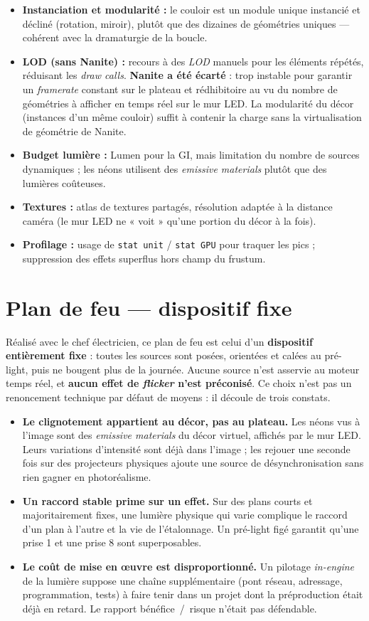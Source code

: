 \documentclass[11pt,a4paper]{report}
\begin{document}
\begin{itemize}
\item \textbf{Instanciation et modularité :} le couloir est un module unique instancié et décliné (rotation, miroir), plutôt que des dizaines de géométries uniques --- cohérent avec la dramaturgie de la boucle.
\item \textbf{LOD (sans Nanite) :} recours à des \emph{LOD} manuels pour les éléments répétés, réduisant les \emph{draw calls}. \textbf{Nanite a été écarté} : trop instable pour garantir un \emph{framerate} constant sur le plateau et rédhibitoire au vu du nombre de géométries à afficher en temps réel sur le mur LED. La modularité du décor (instances d'un même couloir) suffit à contenir la charge sans la virtualisation de géométrie de Nanite.
\item \textbf{Budget lumière :} Lumen pour la GI, mais limitation du nombre de sources dynamiques ; les néons utilisent des \emph{emissive materials} plutôt que des lumières coûteuses.
\item \textbf{Textures :} atlas de textures partagés, résolution adaptée à la distance caméra (le mur LED ne « voit » qu'une portion du décor à la fois).
\item \textbf{Profilage :} usage de \texttt{stat unit} / \texttt{stat GPU} pour traquer les pics ; suppression des effets superflus hors champ du frustum.
\end{itemize}

\section{Plan de feu --- dispositif fixe}
\label{sec:lumiere_fixe}
Réalisé avec le chef électricien, ce plan de feu est celui d'un \textbf{dispositif entièrement fixe} :
toutes les sources sont posées, orientées et calées au pré-light, puis ne bougent plus de la
journée. Aucune source n'est asservie au moteur temps réel, et \textbf{aucun effet de
\emph{flicker} n'est préconisé}. Ce choix n'est pas un renoncement technique par défaut de
moyens : il découle de trois constats.

\begin{itemize}
\item \textbf{Le clignotement appartient au décor, pas au plateau.} Les néons vus à l'image sont
des \emph{emissive materials} du décor virtuel, affichés par le mur LED. Leurs variations
d'intensité sont déjà dans l'image ; les rejouer une seconde fois sur des projecteurs physiques
ajoute une source de désynchronisation sans rien gagner en photoréalisme.
\item \textbf{Un raccord stable prime sur un effet.} Sur des plans courts et majoritairement fixes,
une lumière physique qui varie complique le raccord d'un plan à l'autre et la vie de l'étalonnage.
Un pré-light figé garantit qu'une prise 1 et une prise 8 sont superposables.
\item \textbf{Le coût de mise en \oe uvre est disproportionné.} Un pilotage \emph{in-engine} de la
lumière suppose une chaîne supplémentaire (pont réseau, adressage, programmation, tests) à
faire tenir dans un projet dont la préproduction était déjà en retard. Le rapport bénéfice~/~risque
n'était pas défendable.
\end{itemize}
\end{document}
